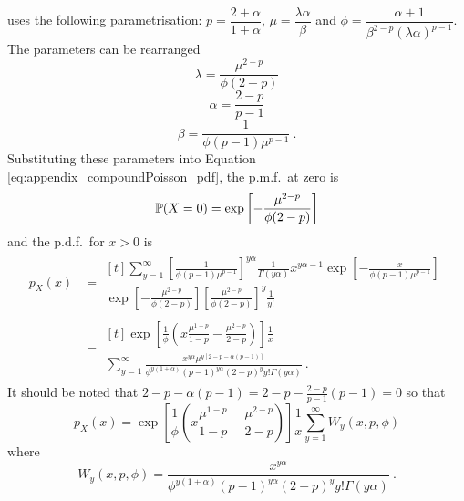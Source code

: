 \cite{jorgensen1987exponential} uses the following parametrisation: $p=\dfrac{2+\alpha}{1+\alpha}$, $\mu=\dfrac{\lambda\alpha}{\beta}$ and $\phi = \dfrac{\alpha+1}{\beta^{2-p}(\lambda\alpha)^{p-1}}$. The parameters can be rearranged
\begin{equation}
  \lambda=\frac{\mu^{2-p}}{\phi(2-p)}
\end{equation}
\begin{equation}
  \alpha=\frac{2-p}{p-1}
\end{equation}
\begin{equation}
  \beta=\frac{1}{\phi(p-1)\mu^{p-1}} \ .
\end{equation}
Substituting these parameters into Equation \eqref{eq:appendix_compoundPoisson_pdf}, the p.m.f.~at zero is
\begin{equation}
  \operatorname{\mathbb{P}}(X=0) = \exp
  \left[
      -\frac{\mu^{2-p}}{\phi(2-p)}
  \right]
\end{equation}
and the p.d.f.~for $x>0$ is
\begin{align*}
  p_X(x) &=
  \begin{multlined}[t]
    \sum_{y=1}^{\infty}
    \left[
      \frac{1}{\phi(p-1)\mu^{p-1}}
    \right]^{y\alpha}
    \frac{1}{\Gamma(y\alpha)}
    x^{y\alpha-1}
    \exp\left[
        -\frac{x}{\phi(p-1)\mu^{p-1}}
    \right]
    \\
    \exp\left[
        -\frac{\mu^{2-p}}{\phi(2-p)}
    \right]
    \left[
      \frac{\mu^{2-p}}{\phi(2-p)}
    \right]^y
    \frac{1}{y!}
  \end{multlined}
  \\
  &= 
  \begin{multlined}[t]
    \exp\left[
      \frac{1}{\phi}\left(x\frac{\mu^{1-p}}{1-p}-\frac{\mu^{2-p}}{2-p}\right)
    \right]
    \frac{1}{x}
    \\
    \sum_{y=1}^{\infty}\frac{x^{y\alpha}\mu^{y[2-p-\alpha(p-1)]}}{\phi^{y(1+\alpha)}(p-1)^{y\alpha}(2-p)^yy!\Gamma(y\alpha)}
    \ .
  \end{multlined}
\end{align*}
It should be noted that $2-p-\alpha(p-1) = 2-p - \frac{2-p}{p-1}(p-1) =0$ so that
\begin{equation}
  p_X(x) = 
  \exp\left[
    \frac{1}{\phi}
    \left(
      x\frac{\mu^{1-p}}{1-p}-\frac{\mu^{2-p}}{2-p}
    \right)
  \right]
  \frac{1}{x}
  \sum_{y=1}^{\infty}W_y(x,p,\phi)
\end{equation}
where
\begin{equation}
  W_y(x,p,\phi)=\frac{x^{y\alpha}}{\phi^{y(1+\alpha)}(p-1)^{y\alpha}(2-p)^yy!\Gamma(y\alpha)}
  \ .
\end{equation}

